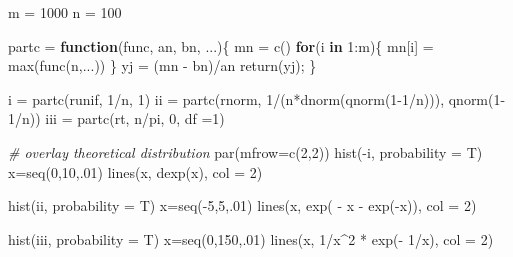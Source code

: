 \documentclass[
  oneside]{book}
\newenvironment{Shaded}{\begin{snugshade}}{\end{snugshade}}
\newcommand{\AttributeTok}[1]{\textcolor[rgb]{0.77,0.63,0.00}{#1}}
\newcommand{\CommentTok}[1]{\textcolor[rgb]{0.56,0.35,0.01}{\textit{#1}}}
\newcommand{\ControlFlowTok}[1]{\textcolor[rgb]{0.13,0.29,0.53}{\textbf{#1}}}
\newcommand{\DecValTok}[1]{\textcolor[rgb]{0.00,0.00,0.81}{#1}}
\newcommand{\FunctionTok}[1]{\textcolor[rgb]{0.00,0.00,0.00}{#1}}
\newcommand{\NormalTok}[1]{#1}
\newcommand{\OtherTok}[1]{\textcolor[rgb]{0.56,0.35,0.01}{#1}}
\newcommand{\SpecialCharTok}[1]{\textcolor[rgb]{0.00,0.00,0.00}{#1}}
\begin{document}
\begin{Shaded}
\begin{Highlighting}[]
\NormalTok{m }\OtherTok{=} \DecValTok{1000}
\NormalTok{n }\OtherTok{=} \DecValTok{100}

\NormalTok{partc }\OtherTok{=} \ControlFlowTok{function}\NormalTok{(func, an, bn, ...)\{}
\NormalTok{  mn }\OtherTok{=} \FunctionTok{c}\NormalTok{()}
  \ControlFlowTok{for}\NormalTok{(i }\ControlFlowTok{in} \DecValTok{1}\SpecialCharTok{:}\NormalTok{m)\{}
\NormalTok{    mn[i] }\OtherTok{=} \FunctionTok{max}\NormalTok{(}\FunctionTok{func}\NormalTok{(n,...))}
\NormalTok{  \}}
\NormalTok{  yj }\OtherTok{=}\NormalTok{ (mn }\SpecialCharTok{{-}}\NormalTok{ bn)}\SpecialCharTok{/}\NormalTok{an}
  \FunctionTok{return}\NormalTok{(yj);}
\NormalTok{\}}

\NormalTok{i }\OtherTok{=} \FunctionTok{partc}\NormalTok{(runif, }\DecValTok{1}\SpecialCharTok{/}\NormalTok{n, }\DecValTok{1}\NormalTok{)}
\NormalTok{ii }\OtherTok{=} \FunctionTok{partc}\NormalTok{(rnorm, }\DecValTok{1}\SpecialCharTok{/}\NormalTok{(n}\SpecialCharTok{*}\FunctionTok{dnorm}\NormalTok{(}\FunctionTok{qnorm}\NormalTok{(}\DecValTok{1{-}1}\SpecialCharTok{/}\NormalTok{n))), }\FunctionTok{qnorm}\NormalTok{(}\DecValTok{1{-}1}\SpecialCharTok{/}\NormalTok{n))}
\NormalTok{iii }\OtherTok{=} \FunctionTok{partc}\NormalTok{(rt, n}\SpecialCharTok{/}\NormalTok{pi, }\DecValTok{0}\NormalTok{, }\AttributeTok{df =}\DecValTok{1}\NormalTok{)}

\CommentTok{\# overlay theoretical distribution}
\FunctionTok{par}\NormalTok{(}\AttributeTok{mfrow=}\FunctionTok{c}\NormalTok{(}\DecValTok{2}\NormalTok{,}\DecValTok{2}\NormalTok{))}
\FunctionTok{hist}\NormalTok{(}\SpecialCharTok{{-}}\NormalTok{i, }\AttributeTok{probability =}\NormalTok{ T)}
\NormalTok{x}\OtherTok{=}\FunctionTok{seq}\NormalTok{(}\DecValTok{0}\NormalTok{,}\DecValTok{10}\NormalTok{,.}\DecValTok{01}\NormalTok{)}
\FunctionTok{lines}\NormalTok{(x, }\FunctionTok{dexp}\NormalTok{(x), }\AttributeTok{col =} \DecValTok{2}\NormalTok{)}

\FunctionTok{hist}\NormalTok{(ii, }\AttributeTok{probability =}\NormalTok{ T)}
\NormalTok{x}\OtherTok{=}\FunctionTok{seq}\NormalTok{(}\SpecialCharTok{{-}}\DecValTok{5}\NormalTok{,}\DecValTok{5}\NormalTok{,.}\DecValTok{01}\NormalTok{)}
\FunctionTok{lines}\NormalTok{(x, }\FunctionTok{exp}\NormalTok{( }\SpecialCharTok{{-}}\NormalTok{ x }\SpecialCharTok{{-}} \FunctionTok{exp}\NormalTok{(}\SpecialCharTok{{-}}\NormalTok{x)), }\AttributeTok{col =} \DecValTok{2}\NormalTok{)}

\FunctionTok{hist}\NormalTok{(iii, }\AttributeTok{probability =}\NormalTok{ T)}
\NormalTok{x}\OtherTok{=}\FunctionTok{seq}\NormalTok{(}\DecValTok{0}\NormalTok{,}\DecValTok{150}\NormalTok{,.}\DecValTok{01}\NormalTok{)}
\FunctionTok{lines}\NormalTok{(x, }\DecValTok{1}\SpecialCharTok{/}\NormalTok{x}\SpecialCharTok{\^{}}\DecValTok{2} \SpecialCharTok{*} \FunctionTok{exp}\NormalTok{(}\SpecialCharTok{{-}} \DecValTok{1}\SpecialCharTok{/}\NormalTok{x), }\AttributeTok{col =} \DecValTok{2}\NormalTok{)}
\end{Highlighting}
\end{Shaded}
\end{document}
